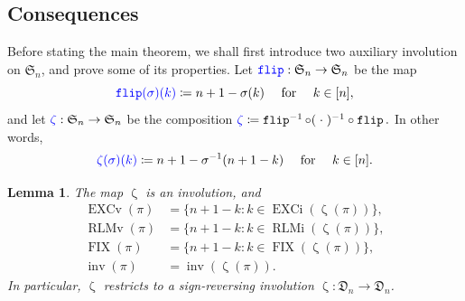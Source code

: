 \documentclass[reqno]{amsart}
\newtheorem{lemma}[theorem]{Lemma}
\theoremstyle{definition}
\newcommand{\defin}[1]{%
\relax\ifmmode%
\textcolor{blue}{#1}%
\else\textcolor{blue}{\emph{#1}}%
\fi%
}
\newcommand{\symS}{\mathfrak{S}}
\newcommand{\dArr}{\mathfrak{D}}
\DeclareMathOperator{\inv}{inv}
\DeclareMathOperator{\FIX}{FIX}
\DeclareMathOperator{\EXCi}{EXCi}
\DeclareMathOperator{\EXCv}{EXCv}
\DeclareMathOperator{\RLMv}{RLMv}
\DeclareMathOperator{\RLMi}{RLMi}
\DeclareMathOperator{\flipMap}{\mathtt{flip}}
\DeclareMathOperator{\zetaMap}{\zeta}
\begin{document}
\subsection{Consequences}

Before stating the main theorem, we shall first 
introduce two auxiliary involution on $ \symS_n$,
and prove some of its properties.
Let $\defin{\flipMap} : \symS_n \to \symS_n$ be the map 
\[
\defin{\flipMap(\sigma)(k)} \coloneqq n+1-\sigma(k) \quad \text{ for } \quad k\in [n],
\]
and let $\defin{\zetaMap} : \symS_n \to \symS_n$ be the composition
$
 \defin{\zetaMap} \coloneqq \flipMap^{-1} \circ (\;\cdot\;)^{-1} \circ \flipMap.
$
In other words,
\[
  \defin{\zetaMap(\sigma)(k)} \coloneqq n+1-\sigma^{-1}(n+1-k) \quad \text{ for } \quad k\in [n].
\] 
\begin{lemma}\label{lem:conjugateProps}
The map $\zetaMap$ is an involution, and
\begin{align*}
 \EXCv(\pi) &= \{ n+1-k : k \in \EXCi( \zetaMap(\pi)) \}, \\
 \RLMv(\pi) &= \{ n+1-k : k \in \RLMi( \zetaMap(\pi)) \},\\
 \FIX(\pi)  &= \{ n+1-k : k \in \FIX( \zetaMap(\pi)) \},\\
 \inv(\pi)  &= \inv(\zetaMap(\pi)).
\end{align*}
In particular, $\zetaMap$ restricts to a sign-reversing
involution $\zetaMap:\dArr_n \to  \dArr_n$.
\end{lemma}
\end{document}
